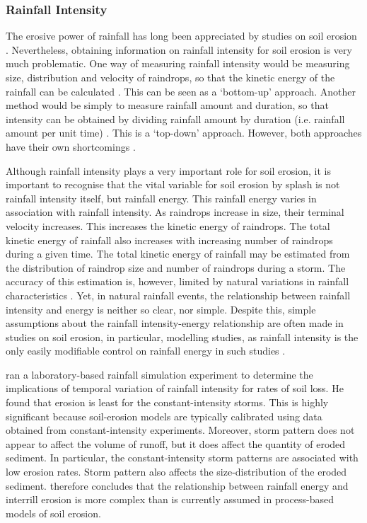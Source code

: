 \subsubsection{Rainfall Intensity} %
\label{sec:RainfallIntensity}

The erosive power of rainfall has long been appreciated by studies on soil
erosion \citep{musgrave1947-133,wischmeier1958-rainfall}. Nevertheless,
obtaining information on rainfall intensity for soil erosion is very much
problematic. One way of measuring rainfall intensity would be measuring size,
distribution and velocity of raindrops, so that the kinetic energy of the
rainfall can be calculated \citep{cerda1997-169,lascelles2000-709}. This can be
seen as a `bottom-up' approach. Another method would be simply to measure
rainfall amount and duration, so that intensity can be obtained by dividing
rainfall amount by duration (i.e. rainfall amount per unit time)
\citep{osborn1998-505}. This is a `top-down' approach. However, both approaches
have their own shortcomings
\citep{parsons2000-723,schuur2001-1019,garcia2001-675}.

Although rainfall intensity plays a very important role for soil erosion, it is
important to recognise that the vital variable for soil erosion by splash is not
rainfall intensity itself, but rainfall energy. This rainfall energy varies in
association with rainfall intensity. As raindrops increase in size, their
terminal velocity increases. This increases the kinetic energy of raindrops. The
total kinetic energy of rainfall also increases with increasing number of
raindrops during a given time. The total kinetic energy of rainfall may be
estimated from the distribution of raindrop size and number of raindrops during
a storm. The accuracy of this estimation is, however, limited by natural
variations in rainfall characteristics \citep{vandijk2002-1}. Yet, in natural
rainfall events, the relationship between rainfall intensity and energy is
neither so clear, nor simple. Despite this, simple assumptions about the
rainfall intensity-energy relationship are often made in studies on soil
erosion, in particular, modelling studies, as rainfall intensity is the
only easily modifiable control on rainfall energy in such studies
\citep{laflen1997-96,morgan1998-389}.

\citet{parsons2006-68} ran a laboratory-based rainfall simulation
experiment to determine the implications of temporal variation of rainfall
intensity for rates of soil loss. He found that erosion is least for the
constant-intensity storms. This is highly significant because soil-erosion
models are typically calibrated using data obtained from constant-intensity
experiments. Moreover, storm pattern does not appear to affect the volume of
runoff, but it does affect the quantity of eroded sediment. In particular, the
constant-intensity storm patterns are associated with low erosion rates. Storm
pattern also affects the size-distribution of the eroded sediment.
\citet{parsons2006-68} therefore concludes that the relationship between
rainfall energy and interrill erosion is more complex than is currently assumed
in process-based models of soil erosion.

